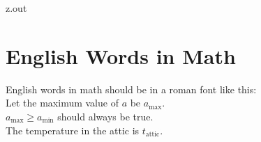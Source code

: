 \begin{VerbatimOut}{z.out}
\newpage

\section{English Words in Math}

English words in math should be in a roman font like this:\\
Let the maximum value of \(a\) be \(a_\text{max}\).\\
\(a_\text{max} \ge a_\text{min}\) should always be true.\\
The temperature in the attic is \(t_\text{attic}\).
\end{VerbatimOut}

\MyIO



\MyIO


